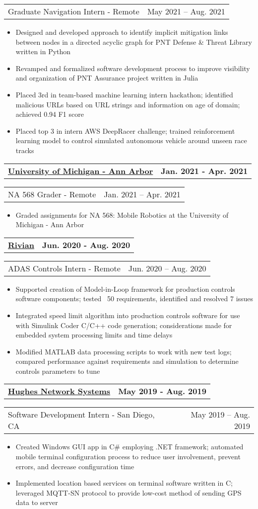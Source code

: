 \documentclass[letterpaper,11pt]{article}
\makeatletter
\newcommand{\resumeItem}[1]{
	\item\small{
		#1
	}
}
\newcommand{\resumeCompanyHeading}[2]{
  \vspace{-1pt}\item
    \begin{tabular*}{0.97\textwidth}[t]{l@{\extracolsep{\fill}}r}
      \textbf{#1} & \textbf{#2} \\
    \end{tabular*}\vspace{-0pt}
}
\newcommand{\resumeJobHeading}[3]{
	\vspace{-1pt}
	\begin{tabular*}{0.97\textwidth}[t]{l@{\extracolsep{\fill}}r}
		{\small#1} - {\small #2} & {\small #3} \\
	\end{tabular*}\vspace{-4pt}
}
\newcommand{\resumeItemListStart}{\begin{itemize}}
\newcommand{\resumeItemListEnd}{\end{itemize}\vspace{-4pt}}
\makeatother
\begin{document}
\resumeJobHeading{Graduate Navigation Intern}{Remote}{May 2021 -- Aug. 2021}
\resumeItemListStart
\resumeItem{Designed and developed approach to identify implicit mitigation links between nodes in a directed acyclic graph for PNT Defense \& Threat Library written in Python}
\resumeItem{Revamped and formalized software development process to improve visibility and organization of PNT Assurance project written in Julia}
\resumeItem{Placed 3rd in team-based machine learning intern hackathon; identified malicious URLs based on URL strings and information on age of domain; achieved 0.94 F1 score}
\resumeItem{Placed top 3 in intern AWS DeepRacer challenge; trained reinforcement learning model to control simulated autonomous vehicle around unseen race tracks}
\resumeItemListEnd

\resumeCompanyHeading{\href{https://umich.edu/}{University of Michigan - Ann Arbor}}{Jan. 2021 - Apr. 2021}
\resumeJobHeading{NA 568 Grader}{Remote}{Jan. 2021 -- Apr. 2021}
\resumeItemListStart
\resumeItem{Graded assignments for NA 568: Mobile Robotics at the University of Michigan - Ann Arbor}
\resumeItemListEnd

\resumeCompanyHeading{\href{https://rivian.com/}{Rivian}}{Jun. 2020 - Aug. 2020}
\resumeJobHeading{ADAS Controls Intern}{Remote}{Jun. 2020 -- Aug. 2020}
\resumeItemListStart
\resumeItem{Supported creation of Model-in-Loop framework for production controls software components; tested ~50 requirements, identified and resolved 7 issues}
\resumeItem{Integrated speed limit algorithm into production controls software for use with Simulink Coder C/C++ code generation; considerations made for embedded system processing limits and time delays}
\resumeItem{Modified MATLAB data processing scripts to work with new test logs; compared performance against requirements and simulation to determine controls parameters to tune}
\resumeItemListEnd

\resumeCompanyHeading{\href{https://www.hughes.com/}{Hughes Network Systems}}{May 2019 - Aug. 2019}
\resumeJobHeading{Software Development Intern}{San Diego, CA}{May 2019 -- Aug. 2019}
\resumeItemListStart
\resumeItem{Created Windows GUI app in C\# employing .NET framework; automated mobile terminal configuration process to reduce user involvement, prevent errors, and decrease configuration time}
\resumeItem{Implemented location based services on terminal software written in C; leveraged MQTT-SN protocol to provide low-cost method of sending GPS data to server}
\resumeItemListEnd
\end{document}
